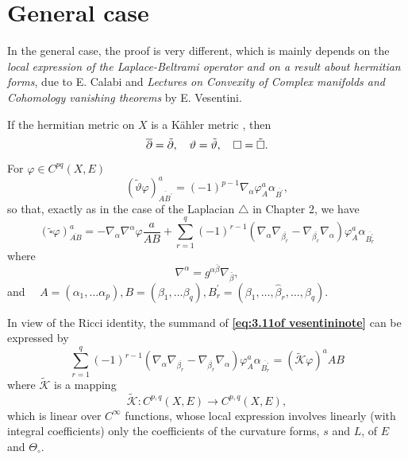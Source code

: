 \documentclass[lang=en,12pt]{beautybook}
\begin{document}
\section{General case}
In the general case, the proof is very different, which is mainly depends on the \textit{local expression of the Laplace-Beltrami operator and on a result about hermitian forms}, due to E. Calabi and \textit{Lectures on Convexity of Complex manifolds and Cohomology vanishing theorems} by E. Vesentini.

If the hermitian metric on $X$ is a K\"ahler metric \cite[P72]{vesentini1967lectures}, then
\begin{equation*}
  \overline{\partial}=\tilde{\partial}, \quad \vartheta=\tilde{\vartheta}, \quad \square=\tilde{\square} .
\end{equation*}
For $\varphi \in C^{p q}(X, E)$
\begin{equation*}
  (\tilde{\vartheta} \varphi)_{\overline{A B^{\prime}}}^a=(-1)^{p-1} \nabla_\alpha \varphi_A^a \alpha_{\overline{B^{\prime}}},
\end{equation*}
so that, exactly as in the case of the Laplacian $\triangle$ in Chapter 2, we have
\begin{equation}\label{eq:3.11of vesentininote}
  (\tilde{\square} \varphi)_{\overline{A B}}^a=-\nabla_\alpha \nabla^\alpha \varphi \frac{a}{A B}+\sum_{r=1}^q(-1)^{r-1}\left(\nabla_\alpha \nabla_{\overline{\beta_r}}-\nabla_{\overline{\beta_r}} \nabla_\alpha\right) \varphi_A^a \alpha_{\overline{B_r^{\prime}}}
\end{equation}
where
\begin{equation*}
  \nabla^\alpha=g^{\alpha \bar{\beta}} \nabla_{\bar{\beta}},
\end{equation*}
and $\quad A=\left(\alpha_1, \ldots \alpha_p\right), B=\left(\beta_1, \ldots \beta_q\right), B_r^{\prime}=\left(\beta_1, \ldots , \hat{\beta}_r, \ldots , \beta_q\right)$.

In view of the Ricci identity, the summand of \textbf{\eqref{eq:3.11of vesentininote}} can be expressed by
\begin{equation}\label{eq:3.12of vesentininote}
  \sum_{r=1}^q(-1)^{r-1}\left(\nabla_\alpha \nabla_{\overline{\beta_r}}-\nabla_{\overline{\beta_r}} \nabla_\alpha\right) \varphi_A^a \alpha_{\overline{B_r^{\prime}}}=(\widetilde{\mathcal{K}} \varphi)^a A B
\end{equation}
where $\widetilde{\mathcal{K}}$ is a mapping
\begin{equation*}
  \widetilde{\mathcal{K}}: C^{p,q}(X, E) \rightarrow C^{p,q}(X, E),
\end{equation*}
which is linear over $C^{\infty}$ functions, whose local expression involves linearly (with integral coefficients) only the coefficients of the curvature forms, $s$ and $L$, of $E$ and $\Theta_{\circ}$.
\end{document}

